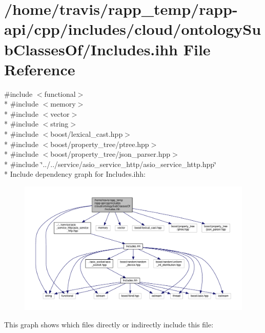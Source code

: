 \hypertarget{cloud_2ontologySubClassesOf_2Includes_8ihh}{\section{/home/travis/rapp\-\_\-temp/rapp-\/api/cpp/includes/cloud/ontology\-Sub\-Classes\-Of/\-Includes.ihh File Reference}
\label{cloud_2ontologySubClassesOf_2Includes_8ihh}
}
{\ttfamily \#include $<$functional$>$}\\*
{\ttfamily \#include $<$memory$>$}\\*
{\ttfamily \#include $<$vector$>$}\\*
{\ttfamily \#include $<$string$>$}\\*
{\ttfamily \#include $<$boost/lexical\-\_\-cast.\-hpp$>$}\\*
{\ttfamily \#include $<$boost/property\-\_\-tree/ptree.\-hpp$>$}\\*
{\ttfamily \#include $<$boost/property\-\_\-tree/json\-\_\-parser.\-hpp$>$}\\*
{\ttfamily \#include \char`\"{}../../service/asio\-\_\-service\-\_\-http/asio\-\_\-service\-\_\-http.\-hpp\char`\"{}}\\*
Include dependency graph for Includes.\-ihh\-:
\nopagebreak
\begin{figure}[H]
\begin{center}
\leavevmode
\includegraphics[width=350pt]{cloud_2ontologySubClassesOf_2Includes_8ihh__incl}
\end{center}
\end{figure}
This graph shows which files directly or indirectly include this file\-:
\nopagebreak

